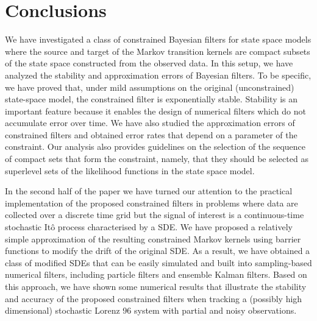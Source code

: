 \documentclass[onefignum,onetabnum]{siamonline250211}%
\begin{document}
%
\section{Conclusions} \label{sConclusions}

We have investigated a class of constrained Bayesian filters for state space models where the source and target of the Markov transition kernels are compact subsets of the state space constructed from the observed data. In this setup, we have analyzed the stability and approximation errors of Bayesian filters. To be specific, we have proved that, under mild assumptions on the original (unconstrained) state-space model, the constrained filter is exponentially stable. Stability is an important feature because it enables the design of numerical filters which do not accumulate error over time. We have also studied the approximation errors of constrained filters and obtained error rates that depend on a parameter of the constraint. Our analysis also provides guidelines on the selection of the sequence of compact sets that form the constraint, namely, that they should be selected as superlevel sets of the likelihood functions in the state space model. %

In the second half of the paper we have turned our attention to the practical implementation of the proposed constrained filters in problems where data are collected over a discrete time grid but the signal of interest is a continuous-time stochastic It\^o process characterised by a SDE. We have proposed a relatively simple approximation of the resulting constrained Markov kernels using barrier functions to modify the drift of the original SDE. As a result, we have obtained a class of modified SDEs that can be easily simulated and built into sampling-based numerical filters, including particle filters and ensemble Kalman filters. Based on this approach, we have shown some numerical results that illustrate the stability and accuracy of the proposed constrained filters when tracking a (possibly high dimensional) stochastic Lorenz 96 system with partial and noisy observations.
\end{document}
